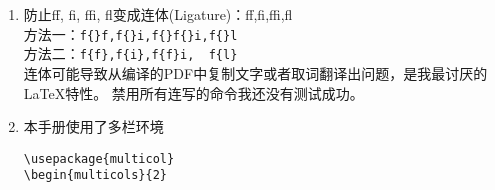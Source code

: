 \documentclass[fontset=windows]{article}
\begin{document}
\begin{multicols}{2}
\begin{enumerate}
\item 防止f{}f, f{}i, f{}f{}i, f{}l变成连体(Ligature)：ff,fi,ffi,fl\\
方法一：\verb|f{}f,f{}i,f{}f{}i,f{}l| \\
方法二：\verb|f{f},f{i},f{f}i,  f{l}| \\
连体可能导致从编译的PDF中复制文字或者取词翻译出问题，是我最讨厌的\LaTeX 特性。
禁用所有连写的命令我还没有测试成功。


\item 本手册使用了多栏环境
\begin{lstlisting}  
\usepackage{multicol}      
\begin{multicols}{2} 


\end{lstlisting}
\end{enumerate}
\end{multicols}
\end{document}
